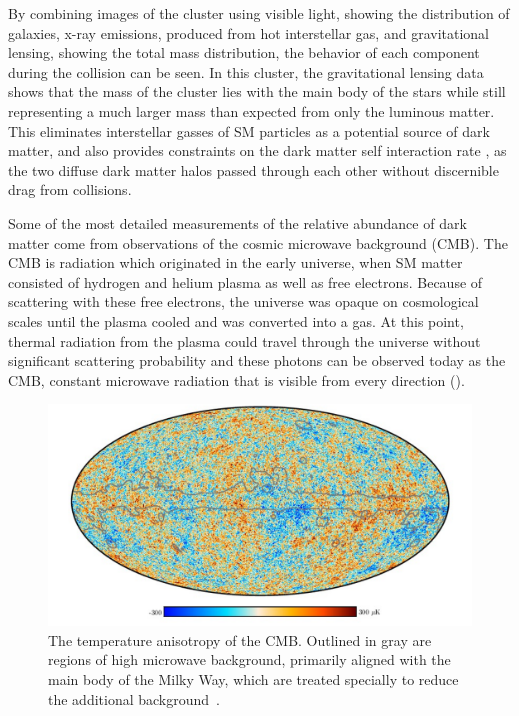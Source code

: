 By combining images of the cluster using visible light, showing the distribution of galaxies, x-ray emissions, produced from hot interstellar gas, and gravitational lensing, showing the total mass distribution, the behavior of each component during the collision can be seen. 
In this cluster, the gravitational lensing data shows that the mass of the cluster lies with the main body of the stars while still representing a much larger mass than expected from only the luminous matter. 
This eliminates interstellar gasses of SM particles as a potential source of dark matter, and also provides constraints on the dark matter self interaction rate \cite{Randall_2008}, as the two diffuse dark matter halos passed through each other without discernible drag from collisions.

Some of the most detailed measurements of the relative abundance of dark matter come from observations of the cosmic microwave background (CMB).
The CMB is radiation which originated in the early universe, when SM matter consisted of hydrogen and helium plasma as well as free electrons.
Because of scattering with these free electrons, the universe was opaque on cosmological scales until the plasma cooled and was converted into a gas. 
At this point, thermal radiation from the plasma could travel through the universe without significant scattering probability and these photons can be observed today as the CMB, constant microwave radiation that is visible from every direction ().

\begin{figure}[htpb]
	\centering
	\includegraphics[width=1.1\textwidth]{figures/cmb.png}
	\caption[The CMB temperature anisotropy]{The temperature anisotropy of the CMB. Outlined in gray are regions of high microwave background, primarily aligned with the main body of the Milky Way, which are treated specially to reduce the additional background~\cite{PlanckCMB}.}
	\label{fig:CMB}
\end{figure}

